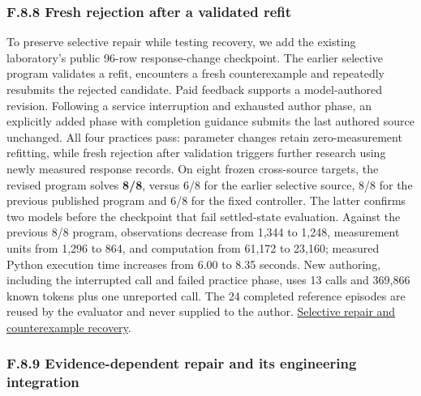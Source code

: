 \documentclass[twoside,11pt]{article}
\begin{document}
\subsubsection*{F.8.8 Fresh rejection after a validated refit}

To preserve selective repair while testing recovery, we add the existing laboratory's
public 96-row response-change checkpoint. The earlier selective program validates
a refit, encounters a fresh counterexample and repeatedly resubmits the rejected
candidate. Paid feedback supports a model-authored revision. Following a service
interruption and exhausted author phase, an explicitly added phase with completion
guidance submits the last authored source unchanged. All four practices pass:
parameter changes retain zero-measurement refitting, while fresh rejection after
validation triggers further research using newly measured response records.
On eight frozen cross-source targets, the revised program solves \textbf{8/8}, versus
6/8 for the earlier selective source, 8/8 for the previous published program and
6/8 for the fixed controller. The latter confirms two models before the checkpoint
that fail settled-state evaluation. Against the previous 8/8 program, observations
decrease from 1,344 to 1,248, measurement units from 1,296 to 864, and computation
from 61,172 to 23,160; measured Python execution time increases from 6.00 to 8.35
seconds. New authoring, including the interrupted call and failed practice phase,
uses 13 calls and 369,866 known tokens plus one unreported call. The 24 completed
reference episodes are reused by the evaluator and never supplied to the author.
\hyperlink{artifact-89}{Selective repair and counterexample recovery}.


\subsubsection*{F.8.9 Evidence-dependent repair and its engineering integration}
\end{document}
